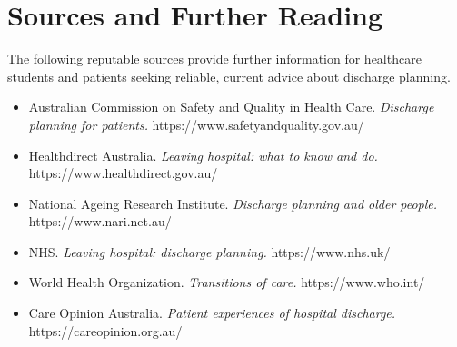 \section*{Sources and Further Reading}
The following reputable sources provide further information for healthcare students and patients seeking reliable, current advice about discharge planning.

\begin{itemize}
    \item Australian Commission on Safety and Quality in Health Care. \textit{Discharge planning for patients.} https://www.safetyandquality.gov.au/
    \item Healthdirect Australia. \textit{Leaving hospital: what to know and do.} https://www.healthdirect.gov.au/
    \item National Ageing Research Institute. \textit{Discharge planning and older people.} https://www.nari.net.au/
    \item NHS. \textit{Leaving hospital: discharge planning.} https://www.nhs.uk/
    \item World Health Organization. \textit{Transitions of care.} https://www.who.int/
    \item Care Opinion Australia. \textit{Patient experiences of hospital discharge.} https://careopinion.org.au/
\end{itemize}

